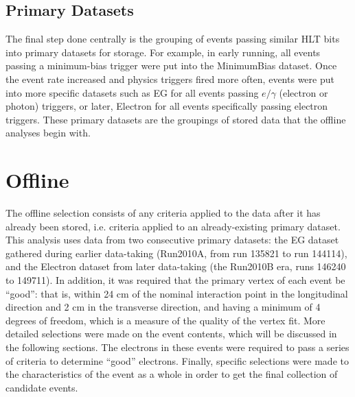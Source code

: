 

\subsection{Primary Datasets}
\label{evSel:PD}
The final step done centrally is the grouping of events passing similar 
HLT bits into primary datasets for storage.  
For example, in early running, all events passing a minimum-bias trigger 
were put into the MinimumBias dataset.  
Once the event rate increased and physics triggers fired more often, 
events were put into more specific datasets such as 
EG for all events passing $e/\gamma$ (electron or photon) triggers, 
or later, Electron for all events specifically passing 
electron triggers.  
These primary datasets are the groupings of stored data 
that the offline analyses begin with.  

\clearpage
\section{Offline}
\label{evSel:offline}
The offline selection consists of any criteria applied to the data 
after it has already been stored, 
i.e. criteria applied to an already-existing primary dataset.  
This analysis uses data from two consecutive primary datasets: 
the EG dataset gathered during earlier data-taking 
(Run2010A, from run 135821 to run 144114), 
and the Electron dataset from later data-taking 
(the Run2010B era, runs 146240 to 149711).  
In addition, it was required that the primary vertex of 
each event be ``good'': 
that is, within 24 cm of the nominal interaction point 
in the longitudinal direction
and 2 cm in the transverse direction, 
and having a minimum of 4 degrees of freedom,
which is a measure of the quality of the vertex fit.  %
More detailed selections were made on the event contents, 
which will be discussed in the following sections.  
The electrons in these events were required to pass 
a series of criteria to determine ``good'' electrons.  
Finally, specific selections were made to the 
characteristics of the event as a whole 
in order to get the final collection of \Zee candidate 
events.  

